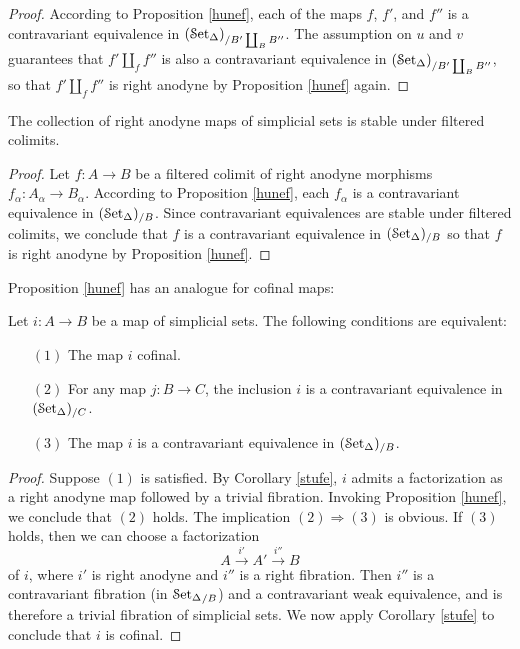 \begin{proof}
According to Proposition \ref{hunef}, each of the maps $f$, $f'$, and $f''$ is a contravariant
equivalence in $(\operatorname{\mathcal{S}et_{\Delta}})_{/B' \coprod_{B} B''}$. The assumption on $u$ and $v$ guarantees that
$f' \coprod_{f} f''$ is also a contravariant equivalence in $(\operatorname{\mathcal{S}et_{\Delta}})_{/B' \coprod_{B} B''}$, so that
$f' \coprod_{f} f''$ is right anodyne by Proposition \ref{hunef} again.
\end{proof}

\begin{corollary}\label{filtanodyne}
The collection of right anodyne maps of simplicial sets is stable under filtered colimits.
\end{corollary}

\begin{proof}
Let $f: A \rightarrow B$ be a filtered colimit of right anodyne morphisms $f_{\alpha}: A_{\alpha} \rightarrow B_{\alpha}$. According to Proposition \ref{hunef}, each $f_{\alpha}$ is a contravariant equivalence in $(\operatorname{\mathcal{S}et_{\Delta}})_{/B}$. Since contravariant equivalences are stable under filtered colimits, we conclude that $f$ is a contravariant equivalence in $(\operatorname{\mathcal{S}et_{\Delta}})_{/B}$ so that $f$ is right anodyne by Proposition \ref{hunef}.
\end{proof}

Proposition \ref{hunef} has an analogue for cofinal maps:

\begin{proposition}\label{huneff}
Let $i: A \rightarrow B$ be a map of simplicial sets. The following conditions are equivalent:
\begin{itemize}
\item[$(1)$] The map $i$ cofinal.
\item[$(2)$] For any map $j: B \rightarrow C$, the inclusion $i$ is a contravariant
equivalence in $(\operatorname{\mathcal{S}et_{\Delta}})_{/C}$.
\item[$(3)$] The map $i$ is a contravariant equivalence in
$(\operatorname{\mathcal{S}et_{\Delta}})_{/B}$.
\end{itemize}
\end{proposition}

\begin{proof}
Suppose $(1)$ is satisfied. By Corollary \ref{stufe}, $i$ admits a factorization as a right anodyne map followed by a trivial fibration. Invoking Proposition \ref{hunef}, we conclude that $(2)$ holds. 
The implication $(2) \Rightarrow (3)$ is obvious. If $(3)$ holds, then we can choose a factorization
$$ A \stackrel{i'}{\rightarrow} A' \stackrel{i''}{\rightarrow} B$$ of $i$, where $i'$ is right anodyne and $i''$ is a right fibration. Then $i''$ is a contravariant fibration (in $\operatorname{\mathcal{S}et_{\Delta}}_{/B}$) and a contravariant weak equivalence, and is therefore a trivial fibration of simplicial sets. 
We now apply Corollary \ref{stufe} to conclude that $i$ is cofinal.
\end{proof}

